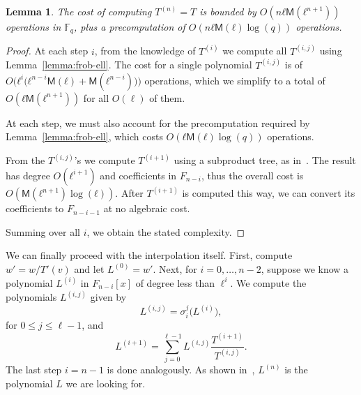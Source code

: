 \documentclass{lms}
\newtheorem{lem}[thm]{Lemma}
\def\cout#1{\mathsf{#1}}
\newcommand{\F}{\mathbb{F}}
\newcommand{\MM}{\cout{M}}
\begin{document}
\begin{lem}\label{lemma:interpolation:minpoly}
  The cost of computing $T^{(n)}=T$ is bounded by $O(nℓ\MM(ℓ^{n+1}))$
  operations in $\F_q$, plus a precomputation of $O(nℓ\MM(ℓ)\log(q))$
  operations.
\end{lem}

\begin{proof}
  At each step $i$, from the knowledge of $T^{(i)}$ we compute all
  $T^{(i,j)}$ using Lemma~\ref{lemma:frob-ell}. The cost for a single
  polynomial $T^{(i,j)}$ is of
  $O\bigl(ℓ^i\bigl(ℓ^{n-i}\MM(ℓ)+\MM(ℓ^{n-i})\bigr)\bigr)$ operations,
  which we simplify to a total of $O(ℓ\MM(ℓ^{n+1}))$ for all $O(\ell)$
  of them.

  At each step, we must also account for the precomputation required
  by Lemma~\ref{lemma:frob-ell}, which costs $O(ℓ\MM(ℓ)\log(q))$
  operations.

  From the $T^{(i,j)}$'s we compute $T^{(i+1)}$ using a subproduct
  tree, as in~\cite[Lemma~10.4]{vzGG}. The result has degree
  $O(ℓ^{i+1})$ and coefficients in $F_{n-i}$, thus the overall cost is
  $O(\MM(ℓ^{n+1})\log(ℓ))$. After $T^{(i+1)}$ is computed this way, we
  can convert its coefficients to $F_{n-i-1}$ at no algebraic cost.

  Summing over all $i$, we obtain the stated complexity.
\end{proof}

We can finally proceed with the interpolation itself. First, compute
$w' = w/T'(v)$ and let $L^{(0)}=w'$.  Next, for $i=0,\dots,n-2$,
suppose we know a polynomial $L^{(i)}$ in $F_{n-i}[x]$ of degree less
than $\ell^i$. We compute the polynomials $L^{(i,j)}$ given by
$$L^{(i,j)}= \sigma_i^j\bigl(L^{(i)}\bigr),$$
for $0 \le j \le \ell-1$, and
$$L^{(i+1)} = \sum_{j=0}^{\ell-1} L^{(i,j)}\frac{T^{(i+1)}}{T^{(i,j)}}.$$ The last step $i=n-1$
is done analogously.  As shown in~\cite{df10}, $L^{(n)}$ is the
polynomial $L$ we are looking for.
\end{document}
